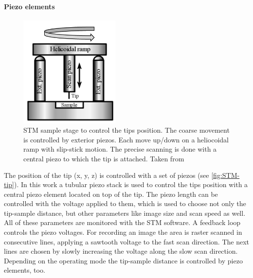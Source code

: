 \paragraph{Piezo elements}
\begin{figure} \centering
	\includegraphics[width=5cm]{./images/STM-sketch-2}
	\caption{STM sample stage to control the tips position. The coarse movement is controlled by exterior piezos. Each move up/down on a heliocoidal ramp with slip-stick motion. The precise scanning is done with a central piezo to which the tip is attached. Taken from}
	\label{fig:stm-heliocoidal ramp}
\end{figure}
The position of the tip (x, y, z) is controlled with a set of piezos (see \autoref{fig:STM-tip}). In this work a tubular piezo stack is used to control the tips position with a central piezo element located on top of the tip. The piezo length can be controlled with the voltage applied to them, which is used to choose not only the tip-sample distance, but other parameters like image size and scan speed as well. All of these parameters are monitored with the STM software. A feedback loop controls the piezo voltages. For recording an image the area is raster scanned in consecutive lines, applying a sawtooth voltage to the fast scan direction. The next lines are chosen by slowly increasing the voltage along the slow scan direction. Depending on the operating mode the tip-sample distance is controlled by piezo elements, too.


